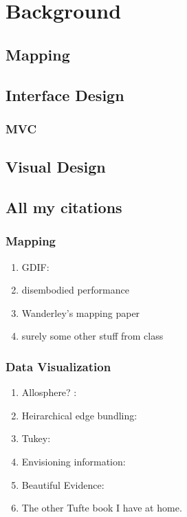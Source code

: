 \chapter{Background}

\section{Mapping}

\section{Interface Design}
\subsection{MVC}


\section{Visual Design}

\section{All my citations}

\subsection{Mapping}
	\begin{enumerate}
		\item GDIF: \cite{GDIF}
		\item disembodied performance
		\item Wanderley's mapping paper \cite{wanderley}
		\item surely some other stuff from class
	\end{enumerate}

\subsection{Data Visualization}
	\begin{enumerate}
		\item Allosphere? :\cite{allosphere}
		\item Heirarchical edge bundling: \cite{HEB}
		\item Tukey: \cite{tuckey}
		\item Envisioning information: \cite{tufte1}
		\item Beautiful Evidence: \cite{tufte2}
		\item The other Tufte book I have at home.
	\end{enumerate}


